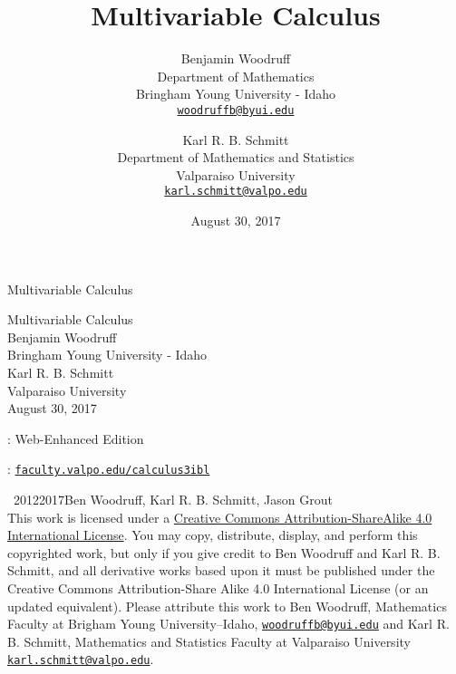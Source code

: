 \documentclass[10pt,]{book}
\title{Multivariable Calculus}
\author{Benjamin Woodruff\\
Department of Mathematics\\
Bringham Young University - Idaho\\
\href{mailto:woodruffb@byui.edu}{\nolinkurl{woodruffb@byui.edu}}
\and
Karl R. B. Schmitt\\
Department of Mathematics and Statistics \\
Valparaiso University\\
\href{mailto:karl.schmitt@valpo.edu}{\nolinkurl{karl.schmitt@valpo.edu}}
}
\date{August 30, 2017}
\theoremstyle{plain}
\theoremstyle{definition}
\theoremstyle{definition}
\theoremstyle{definition}
\theoremstyle{definition}
\theoremstyle{definition}
\numberwithin{equation}{section}
\begin{document}
\frontmatter
\thispagestyle{empty}
{\centering
\vspace*{0.28\textheight}
{\Huge Multivariable Calculus}\\}
\clearpage
\thispagestyle{empty}
\null%
\clearpage
\thispagestyle{empty}
{\centering
\vspace*{0.14\textheight}
{\Huge Multivariable Calculus}\\[3\baselineskip]
{\Large Benjamin Woodruff}\\[0.5\baselineskip]
{\Large Bringham Young University - Idaho}\\[3\baselineskip]
{\Large Karl R. B. Schmitt}\\[0.5\baselineskip]
{\Large Valparaiso University}\\[3\baselineskip]
{\Large August 30, 2017}\\}
\clearpage
\thispagestyle{empty}
: Web-Enhanced Edition\par\medskip
{}: \href{http://faculty.valpo.edu/calculus3ibl}{\lstinline?faculty.valpo.edu/calculus3ibl?}\par\medskip
\noindent\textcopyright\ 2012\textendash{}2017\quad{}Ben Woodruff, Karl R. B. Schmitt, Jason Grout\\[0.5\baselineskip]
 This work is licensed under a \href{http://creativecommons.org/licenses/by-sa/4.0/}{Creative Commons Attribution-ShareAlike 4.0 International License}. You may copy, distribute, display, and perform this copyrighted work, but only if you give credit to Ben Woodruff and Karl R. B. Schmitt, and all derivative works based upon it must be published under the Creative Commons Attribution-Share Alike 4.0 International License (or an updated equivalent). Please attribute this work to Ben Woodruff, Mathematics Faculty at Brigham Young University--Idaho, \href{mailto:woodruffb@byui.edu}{\nolinkurl{woodruffb@byui.edu}} and Karl R. B. Schmitt, Mathematics and Statistics Faculty at Valparaiso University \href{mailto:karl.schmitt@valpo.edu}{\nolinkurl{karl.schmitt@valpo.edu}}.\par\medskip
{}
\null\clearpage
\end{document}
